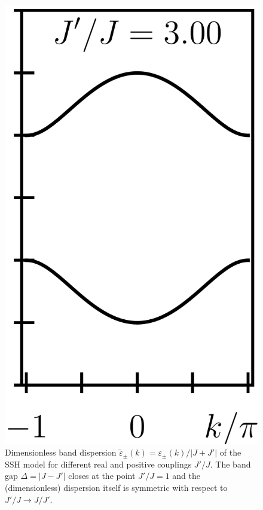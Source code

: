 \begin{figure}[ht]
    \includegraphics{figures/cropped_ssh_dispersion_3.png}
    \caption{Dimensionless band dispersion $\tilde\varepsilon_\pm(k)=\varepsilon_\pm(k)/|J+J'|$ of the SSH model for different real and positive couplings $J'/J$. The band gap $\Delta=|J-J'|$ closes at the point $J'/J=1$ and the (dimensionless) dispersion itself is symmetric with respect to $J'/J\rightarrow J/J'$.}
    \label{fig:ssh_dispersion}
\end{figure}

